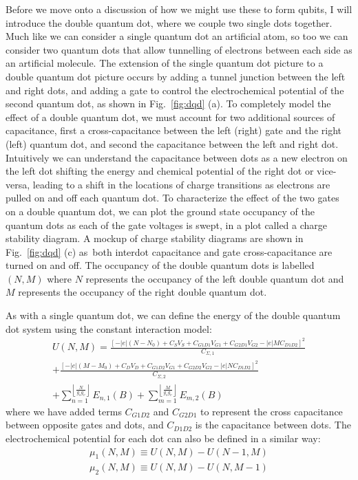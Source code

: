 Before we move onto a discussion of how we might use these to form qubits, I will introduce the double quantum dot,
where we couple two single dots together. Much like we can consider a single quantum dot an
artificial atom, so too we can consider two quantum dots that allow tunnelling of electrons between each side as
an artificial molecule. The extension of the single quantum dot picture to a double quantum dot picture occurs by
adding a tunnel junction between the left and right dots, and adding a gate to control the
electrochemical potential of the second quantum dot, as shown in Fig.~\ref{fig:dqd} (a).
To completely model the effect of a double quantum dot, we must account for two additional sources of capacitance, first
a cross-capacitance between the left (right) gate and the right (left) quantum dot, and second the capacitance between
the left and right dot. Intuitively we can understand the capacitance between dots as a new electron on the left dot
shifting the energy and chemical potential of the right dot or vice-versa, leading to a shift in the locations of charge
transitions as electrons are pulled on and off each quantum dot. To characterize the effect of the two gates on a double
quantum dot, we can plot the ground state occupancy of the quantum dots as each of the gate voltages is swept, in a plot
called a charge stability diagram. A mockup of charge stability diagrams are shown in Fig.~\ref{fig:dqd} (c) as both interdot
capacitance and gate cross-capacitance are turned on and off. The occupancy of the double quantum dots is labelled
$(N, M)$ where $N$ represents the occupancy of the left double quantum dot and $M$ represents the occupancy of
the right double quantum dot.

As with a single quantum dot, we can define the energy of the double quantum dot system using the constant
interaction model:
\begin{multline}
  U(N, M) = \frac{[-|e|(N-N_{0}) + C_SV_S + C_{G1D1}V_{G1} + C_{G2D1}V_{G2} - |e|MC_{D1D2}]^2}{C_{\Sigma,1}} \\
          + \frac{[-|e|(M-M_{0}) + C_DV_D + C_{G1D2}V_{G1} + C_{G2D2}V_{G2} - |e|NC_{D1D2}]^2}{C_{\Sigma,2}} \\
          + \sum_{n=1}^{\left\lfloor\frac{N}{g_sg_v}\right\rfloor} E_{n,1}(B)
          + \sum_{m=1}^{\left\lfloor\frac{M}{g_sg_v}\right\rfloor} E_{m,2}(B)
\end{multline}
where we have added terms $C_{G1D2}$ and $C_{G2D1}$ to represent the cross capacitance between opposite
gates and dots, and $C_{D1D2}$ is the capacitance between dots. The electrochemical potential for each dot
can also be defined in a similar way:
\begin{align}
  \mu_1(N, M) \equiv U(N, M) - U(N-1, M) \\
  \mu_2(N, M) \equiv U(N, M) - U(N, M-1)
\end{align}

